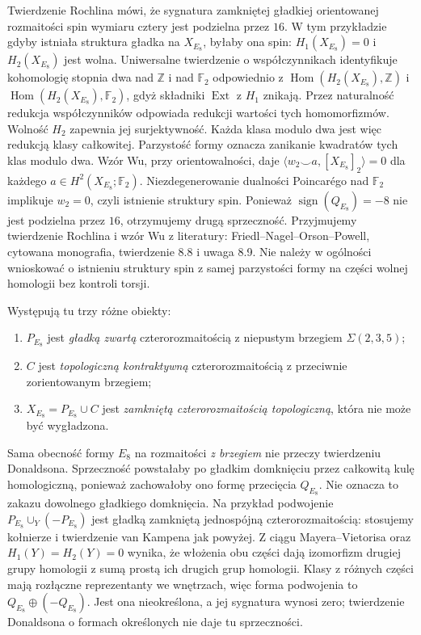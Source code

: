 \begin{uwaga}
Twierdzenie Rochlina mówi, że sygnatura
zamkniętej gładkiej orientowanej rozmaitości
spin wymiaru cztery jest podzielna przez $16$.
W tym przykładzie gdyby istniała struktura gładka
na $X_{E_8}$, byłaby ona spin: $H_1(X_{E_8})=0$
i $H_2(X_{E_8})$ jest wolna. Uniwersalne
twierdzenie o współczynnikach identyfikuje
kohomologię stopnia dwa nad $\mathbb Z$
i nad $\mathbb F_2$ odpowiednio z
$\operatorname{Hom}(H_2(X_{E_8}),\mathbb Z)$
i $\operatorname{Hom}(H_2(X_{E_8}),\mathbb F_2)$,
gdyż składniki $\operatorname{Ext}$ z $H_1$
znikają. Przez naturalność redukcja
współczynników odpowiada redukcji wartości
tych homomorfizmów. Wolność $H_2$ zapewnia
jej surjektywność. Każda klasa modulo dwa
jest więc redukcją klasy całkowitej. Parzystość formy oznacza
zanikanie kwadratów tych klas modulo dwa.
Wzór Wu, przy orientowalności, daje
$\langle w_2\smile a,[X_{E_8}]_2\rangle=0$
dla każdego $a\in H^2(X_{E_8};\mathbb F_2)$.
Niezdegenerowanie dualności Poincarégo nad
$\mathbb F_2$ implikuje $w_2=0$, czyli
istnienie struktury spin.
Ponieważ $\operatorname{sign}(Q_{E_8})=-8$
nie jest podzielna przez $16$, otrzymujemy
drugą sprzeczność.
Przyjmujemy twierdzenie Rochlina i wzór Wu
z literatury: Friedl--Nagel--Orson--Powell,
cytowana monografia, twierdzenie 8.8
i uwaga 8.9. Nie należy w ogólności
wnioskować o istnieniu struktury spin
z samej parzystości formy na części wolnej
homologii bez kontroli torsji.
\end{uwaga}

\begin{uwaga}
Występują tu trzy różne obiekty:
\begin{enumerate}[label=(\roman*)]
\item $P_{E_8}$ jest \emph{gładką zwartą} czterorozmaitością
z niepustym brzegiem $\Sigma(2,3,5)$;
\item $C$ jest \emph{topologiczną kontraktywną}
czterorozmaitością z przeciwnie zorientowanym brzegiem;
\item $X_{E_8}=P_{E_8}\cup C$ jest \emph{zamkniętą
czterorozmaitością topologiczną}, która nie może być wygładzona.
\end{enumerate}
Sama obecność formy $E_8$ na rozmaitości \emph{z brzegiem}
nie przeczy twierdzeniu Donaldsona. Sprzeczność powstałaby
po gładkim domknięciu przez całkowitą kulę homologiczną,
ponieważ zachowałoby ono formę przecięcia $Q_{E_8}$.
Nie oznacza to zakazu dowolnego gładkiego domknięcia.
Na przykład podwojenie
$P_{E_8}\cup_Y(-P_{E_8})$ jest gładką zamkniętą
jednospójną czterorozmaitością: stosujemy kołnierze
i twierdzenie van Kampena jak powyżej.
Z ciągu Mayera--Vietorisa oraz
$H_1(Y)=H_2(Y)=0$ wynika, że włożenia obu części
dają izomorfizm drugiej grupy homologii z sumą
prostą ich drugich grup homologii.
Klasy z różnych części mają rozłączne reprezentanty
we wnętrzach, więc forma podwojenia to
$Q_{E_8}\oplus(-Q_{E_8})$.
Jest ona nieokreślona, a jej sygnatura wynosi zero;
twierdzenie Donaldsona o formach określonych
nie daje tu sprzeczności.
\end{uwaga}

